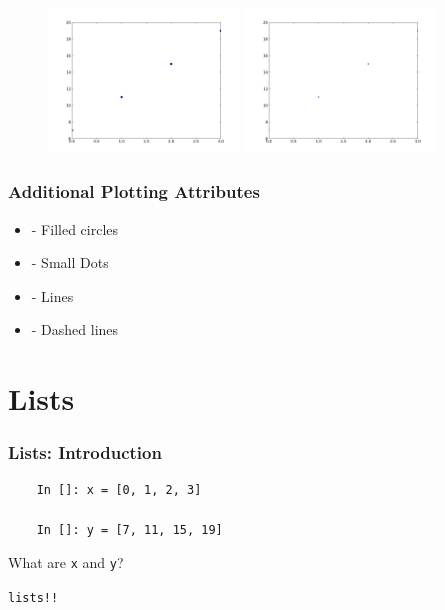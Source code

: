 \documentclass[14pt,compress]{beamer}
\newcommand{\typ}[1]{\lstinline{#1}}
\newcommand{\kwrd}[1]{ \texttt{\textbf{\color{blue}{#1}}}  }
\begin{document}
\begin{frame}[fragile]
\begin{figure}
\includegraphics[width=2in]{data/stline_dots.png}
\includegraphics[width=2in]{data/stline_points.png}
\end{figure}
\end{frame}

\begin{frame}[fragile]
\frametitle{Additional Plotting Attributes}
\begin{itemize}
  \item \kwrd{'o'} - Filled circles
  \item \kwrd{'.'} - Small Dots
  \item \kwrd{'-'} - Lines
  \item \kwrd{'- -'} - Dashed lines
\end{itemize}
\end{frame}

\section{Lists}
\begin{frame}[fragile]
  \frametitle{Lists: Introduction}
  \begin{lstlisting}
    In []: x = [0, 1, 2, 3]

    In []: y = [7, 11, 15, 19]

  \end{lstlisting}
What are \typ{x} and \typ{y}?\\
\begin{center}
\alert{\typ{lists!!}}
\end{center}
\end{frame}
\end{document}

